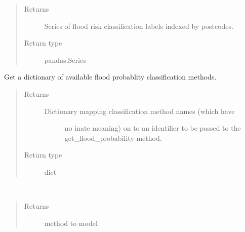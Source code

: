 \documentclass[letterpaper,10pt,english]{sphinxmanual}
\begin{document}
\begin{fulllineitems}
\begin{fulllineitems}
\begin{quote}
\begin{description}
\begin{itemize}
\end{itemize}

\item[{Returns}] \leavevmode
\sphinxAtStartPar
Series of flood risk classification labels indexed by postcodes.

\item[{Return type}] \leavevmode
\sphinxAtStartPar
pandas.Series

\end{description}\end{quote}

\end{fulllineitems}


\begin{fulllineitems}
\label{\detokenize{index:flood_tool.Tool.get_flood_class_methods}}
\sphinxAtStartPar
Get a dictionary of available flood probablity classification methods.
\begin{quote}\begin{description}
\item[{Returns}] \leavevmode
\sphinxAtStartPar
\begin{description}
\item[{Dictionary mapping classification method names (which have}] \leavevmode
\sphinxAtStartPar
no inate meaning) on to an identifier to be passed to the
get\_flood\_probability method.

\end{description}


\item[{Return type}] \leavevmode
\sphinxAtStartPar
dict

\end{description}\end{quote}

\end{fulllineitems}


\begin{fulllineitems}
\label{\detokenize{index:flood_tool.Tool.get_flood_class_models}}~\begin{quote}\begin{description}
\item[{Returns}] \leavevmode
\sphinxAtStartPar
method to model


\end{description}
\end{quote}
\end{fulllineitems}
\end{fulllineitems}
\end{document}
